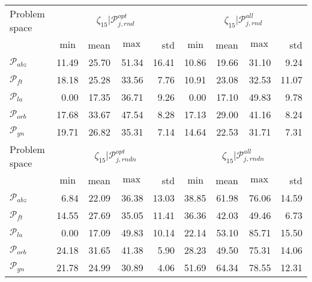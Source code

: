 \begin{tabular}{|l|rrrr|rrrr|} \hline 
Problem space & 
\multicolumn{4}{c|}{$\zeta_{15}\big|\mathcal{P}_{j,rnd}^{opt}$} & \multicolumn{4}{c|}{$\zeta_{15}\big|\mathcal{P}_{j,rnd}^{all}$} \\
&$\min$&mean&$\max$&std&$\min$&mean&$\max$&std\\ \hline
$\mathcal{P}_{abz}$&11.49&25.70&51.34&16.41 &10.86&19.66&31.10&9.24\\
$\mathcal{P}_{ft}$&18.18&25.28&33.56&7.76  &10.91&23.08&32.53&11.07\\
$\mathcal{P}_{la}$&0.00&17.35&36.71&9.26  &0.00&17.10&49.83&9.78\\
$\mathcal{P}_{orb}$&17.68&33.67&47.54&8.28  &17.13&29.00&41.16&8.24\\
$\mathcal{P}_{yn}$&19.71&26.82&35.31&7.14  &14.64&22.53&31.71&7.31\\ \hline\hline
Problem space & 
\multicolumn{4}{c|}{$\zeta_{15}\big|\mathcal{P}_{j,rndn}^{opt}$}& \multicolumn{4}{c|}{$\zeta_{15}\big|\mathcal{P}_{j,rndn}^{all}$}\\
&$\min$&mean&$\max$&std&$\min$&mean&$\max$&std\\ \hline
$\mathcal{P}_{abz}$&6.84&22.09&36.38&13.03 &38.85&61.98&76.06&14.59\\
$\mathcal{P}_{ft}$&14.55&27.69&35.05&11.41  &36.36&42.03&49.46&6.73\\
$\mathcal{P}_{la}$&0.00&17.09&49.83&10.14  &22.14&53.10&85.71&15.50\\
$\mathcal{P}_{orb}$&24.18&31.65&41.38&5.90  &28.23&49.50&75.31&14.06\\
$\mathcal{P}_{yn}$&21.78&24.99&30.89&4.06  &51.69&64.34&78.55&12.31\\
\hline
\end{tabular}
